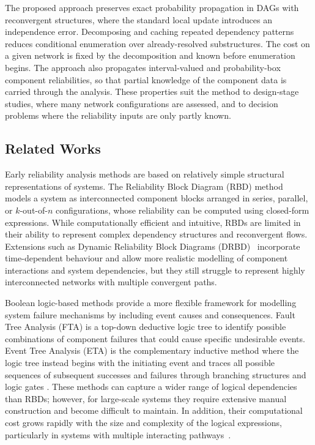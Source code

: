 \documentclass[preprint,12pt]{elsarticle}
\begin{document}
The proposed approach preserves exact probability propagation in DAGs with reconvergent structures, where the standard local update introduces an independence error. Decomposing and caching repeated dependency patterns reduces conditional enumeration over already-resolved substructures. The cost on a given network is fixed by the decomposition and known before enumeration begins. The approach also propagates interval-valued and probability-box component reliabilities, so that partial knowledge of the component data is carried through the analysis. These properties suit the method to design-stage studies, where many network configurations are assessed, and to decision problems where the reliability inputs are only partly known.


\subsection{Related Works}\label{subsec:relatedworks}

Early reliability analysis methods are based on relatively simple structural representations of systems. The Reliability Block Diagram (RBD) method~\cite{billinton_network_1992,rausand_m_2014_reliability_2014,ebeling_introduction_2019} models a system as interconnected component blocks arranged in series, parallel, or $k$-out-of-$n$ configurations, whose reliability can be computed using closed-form expressions. While computationally efficient and intuitive, RBDs are limited in their ability to represent complex dependency structures and reconvergent flows. Extensions such as Dynamic Reliability Block Diagrams (DRBD)~\cite{distefano_dynamic_2007} incorporate time-dependent behaviour and allow more realistic modelling of component interactions and system dependencies, but they still struggle to represent highly interconnected networks with multiple convergent paths.

Boolean logic-based methods provide a more flexible framework for modelling system failure mechanisms by including event causes and consequences. Fault Tree Analysis (FTA) \cite{xing_fault_2008} is a top-down deductive logic tree to identify possible combinations of component failures that could cause specific undesirable events. Event Tree Analysis (ETA) is the complementary inductive method where the logic tree instead begins with the initiating event and traces all possible sequences of subsequent successes and failures through branching structures and logic gates \cite{cepin_event_2011}. These methods can capture a wider range of logical dependencies than RBDs; however, for large-scale systems they require extensive manual construction and become difficult to maintain. In addition, their computational cost grows rapidly with the size and complexity of the logical expressions, particularly in systems with multiple interacting pathways~\cite{sherwin_fault_1993,xing_fault_2008}.
\end{document}
